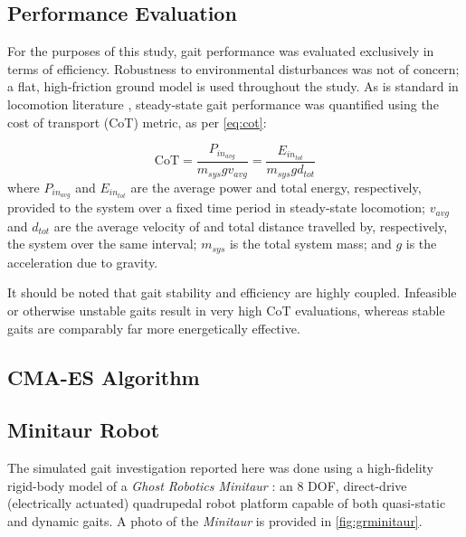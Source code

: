 \documentclass[conference,11pt,letterpaper]{IEEEtran}
\begin{document}
\subsection{Performance Evaluation} \label{sec:performance}

For the purposes of this study, gait performance was evaluated exclusively in terms of efficiency. Robustness to environmental disturbances was not of concern; a flat, high-friction ground model is used throughout the study. As is standard in locomotion literature \autocite{von1950price}, steady-state gait performance was quantified using the cost of transport (CoT) metric, as per \cref{eq:cot}:

    \begin{equation} \label{eq:cot}
        \text{CoT} = \frac{P_{in_{avg}}}{m_{sys}gv_{avg}} = \frac{E_{in_{tot}}}{m_{sys}gd_{tot}}
    \end{equation}
where $P_{in_{avg}}$ and $E_{in_{tot}}$ are the average power and total energy, respectively, provided to the system over a fixed time period in steady-state locomotion; $v_{avg}$ and $d_{tot}$ are the average velocity of and total distance travelled by, respectively, the system over the same interval; $m_{sys}$ is the total system mass; and $g$ is the acceleration due to gravity.

It should be noted that gait stability and efficiency are highly coupled. Infeasible or otherwise unstable gaits result in very high CoT evaluations, whereas stable gaits are comparably far more energetically effective.

\subsection{CMA-ES Algorithm} \label{sec:cmaes}



\subsection{Minitaur Robot}

The simulated gait investigation reported here was done using a high-fidelity rigid-body model of a \emph{Ghost Robotics Minitaur} \autocite{grminitaur}: an 8 DOF, direct-drive (electrically actuated) quadrupedal robot platform capable of both quasi-static and dynamic gaits. A photo of the \emph{Minitaur} is provided in \cref{fig:grminitaur}.
\end{document}
